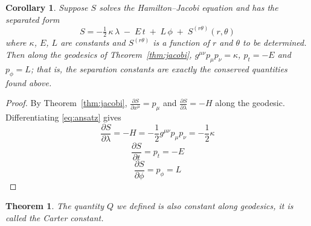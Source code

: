 \documentclass{article}
\newtheorem{theorem}{Theorem}[section]
\newtheorem{corollary}{Corollary}[theorem]
\theoremstyle{remark}
\begin{document}
\begin{corollary}
    Suppose $S$ solves the Hamilton--Jacobi equation and has the separated form
    \begin{equation}\label{eq:ansatz}
        S 
        = 
        -\tfrac{1}{2}\,\kappa\,\lambda
        \;-\;
        E\,t
        \;+\;
        L\,\phi
        \;+\;
        S^{(r\theta)}(r,\theta)
    \end{equation}
    where $\kappa$, $E$, $L$ are constants and \(S^{(r\theta)}\) is a function of \(r\) and \(\theta\) to be determined. Then along the geodesics of Theorem~\ref{thm:jacobi}, $g^{\mu\nu}p_{\mu}p_{\nu}=\kappa$, $p_t=-E$ and $p_{\phi}=L$; that is, the separation constants are exactly the conserved quantities found above.
\end{corollary}
\begin{proof}
    By Theorem~\ref{thm:jacobi}, $\frac{\partial S}{\partial x^{\mu}} = p_{\mu}$ and $\frac{\partial S}{\partial \lambda} = -H$ along the geodesic. Differentiating \eqref{eq:ansatz} gives
    \begin{equation}
        \frac{\partial S}{\partial \lambda} = -H = -\frac{1}{2}g^{\mu\nu}p_{\mu}p_{\nu}=-\frac{1}{2}\kappa
    \end{equation}
    \begin{equation}
        \frac{\partial S}{\partial t}=p_t = -E
    \end{equation}
    \begin{equation}
        \frac{\partial S}{\partial \phi}=p_{\phi} = L
    \end{equation}
\end{proof}
\begin{theorem}
    The quantity $Q$ we defined is also constant along geodesics, it is called the Carter constant.
\end{theorem}
\end{document}
